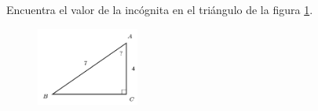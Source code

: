 \question[15]  Encuentra el valor de la incógnita en el triángulo de la figura \ref{fig:angle_functrig_18}.
\begin{figure}[H]
    \begin{center}
        \includegraphics[width=0.3\textwidth]{../images/angle_functrig_18.png}
    \end{center}
    \caption{}
    \label{fig:angle_functrig_18}
\end{figure}